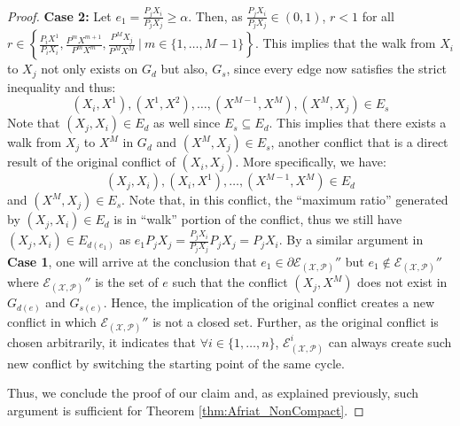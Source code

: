 \documentclass{article} %
\theoremstyle{style1}
\theoremstyle{example}
\begin{document}
\begin{proof}
\textbf{Case 2:} Let $e_1=\frac{P_jX_i}{P_jX_j}\geq \alpha$. Then, as $\frac{P_jX_i}{P_jX_j}\in(0,1)$, $r<1$ for all $r\in\left\{\frac{P_iX^1}{P_iX_i},\frac{P^mX^{m+1}}{P^mX^m},\frac{P^MX_j}{P^MX^M}\ |\ m\in\{1,\ldots, M-1\}\right\}$. This implies that the walk from $X_i$ to $X_j$ not only exists on $G_d$ but also, $G_s$, since every edge now satisfies the strict inequality and thus:
$$(X_i,X^1),(X^1,X^2),\ldots, (X^{M-1},X^M), (X^M, X_j)\in E_s$$ 
Note that $(X_j,X_i)\in E_d$ as well since $E_s\subseteq E_d$. This implies that there exists a walk from $X_j$ to $X^M$ in $G_d$ and $(X^M, X_j)\in E_s$, another conflict that is a direct result of the original conflict of $(X_i, X_j)$. More specifically, we have:
$$(X_j,X_i),(X_i,X^1),\ldots, (X^{M-1},X^M)\in E_d$$
and $(X^M,X_j)\in E_s$. Note that, in this conflict, the ``maximum ratio'' generated by $(X_j,X_i)\in E_d$ is in ``walk'' portion of the conflict, thus we still have $(X_j,X_i)\in E_{d(e_1)}$ as $e_1 P_jX_j = \frac{P_jX_i}{P_jX_j}P_jX_j = P_jX_i$. By a similar argument in \textbf{Case 1}, one will arrive at the conclusion that $e_1\in \partial \mathcal{E}_{(\mathcal{X},\mathcal{P})}''$ but $e_1\not\in \mathcal{E}_{(\mathcal{X},\mathcal{P})}''$ where $\mathcal{E}_{(\mathcal{X},\mathcal{P})}''$ is the set of $e$ such that the conflict $(X_j, X^M)$ does not exist in $G_{d(e)}$ and $G_{s(e)}$. Hence, the implication of the original conflict creates a new conflict in which $\mathcal{E}_{(\mathcal{X},\mathcal{P})}''$ is not a closed set. Further, as the original conflict is chosen arbitrarily, it indicates that $\forall i\in\{1,\ldots, n\}$, $\mathcal{E}_{(\mathcal{X},\mathcal{P})}^i$ can always create such new conflict by switching the starting point of the same cycle.

Thus, we conclude the proof of our claim and, as explained previously, such argument is sufficient for Theorem \ref{thm:Afriat_NonCompact}.
\end{proof}



\end{document}
